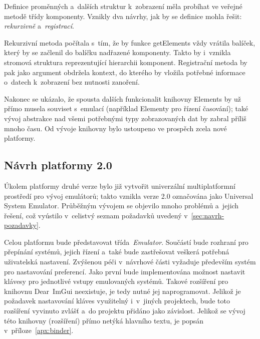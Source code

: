 Definice proměnných a~dalších struktur k~zobrazení měla probíhat ve veřejné metodě třídy komponenty. Vznikly dva návrhy, jak by se definice mohla řešit: \emph{rekurzivně} a~\emph{registrací}.

Rekurzivní metoda počítala s~tím, že by funkce getElements vždy vrátila balíček, který by se začlenil do balíčku nadřazené komponenty. Takto by i~vznikla stromová struktura reprezentující hierarchii komponent. Registrační metoda by pak jako argument obdržela kontext, do kterého by vložila potřebné informace o~datech k~zobrazení bez nutnosti zanoření.

Nakonec se ukázalo, že spousta dalších funkcionalit knihovny Elements by už přímo musela souviset s~emulací (například Elementy pro řízení časování); také vývoj abstrakce nad všemi potřebnými typy zobrazovaných dat by zabral příliš mnoho času. Od vývoje knihovny bylo ustoupeno ve prospěch zcela nové platformy.

\subsection{Návrh platformy 2.0}
Úkolem platformy druhé verze bylo již vytvořit univerzální multiplatformní prostředí pro vývoj emulátorů; takto vznikla verze 2.0 označována jako Universal System Emulator. Průběžným vývojem se objevilo mnoho problémů a~jejich řešení, což vyústilo v~celistvý seznam požadavků uvedený v~\ref{sec:navrh-pozadavky}.

Celou platformu bude představovat třída~\emph{Emulator}. Součástí bude rozhraní pro přepínání systémů, jejich řízení a~také bude zastřešovat veškerá potřebná uživatelská nastavení. Zvýšenou péči v~návrhové části vyžaduje především systém pro nastavování preferencí. Jako první bude implementována možnost nastavit klávesy pro jednotlivé vstupy emulovaných systémů. Takové rozšíření pro knihovnu Dear~ImGui neexistuje, je tedy nutné jej naprogramovat. Jelikož je požadavek nastavování kláves využitelný i~v~jiných projektech, bude toto rozšíření vyvinuto zvlášť a~do projektu přidáno jako závislost. Jelikož se vývoj této knihovny (rozšíření) přímo netýká hlavního textu, je popsán v~příloze~\ref{apx:binder}.

